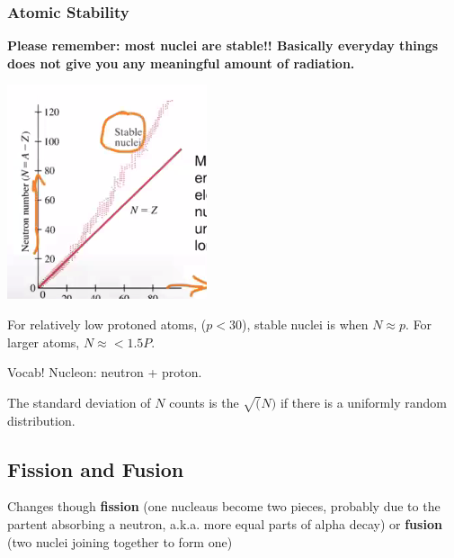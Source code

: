 \documentclass[letterpaper]{article}
\begin{document}
\subsubsection{Atomic Stability}
\label{sec:org265c84f}
\textbf{Please remember: most nuclei are stable!! Basically everyday things
does not give you any meaningful amount of radiation.}

\begin{center}
\includegraphics[width=.9\linewidth]{stablenuclei.png}
\end{center}

For relatively low protoned atoms, (\(p < 30\)), stable nuclei is when
\(N \approx p\). For larger atoms, \(N \approx < 1.5P\).

Vocab! Nucleon: neutron + proton.

The standard deviation of \(N\) counts is the \(\sqrt(N)\) if there is a
uniformly random distribution.

\subsection{Fission and Fusion}
\label{sec:orgdd927a6}
Changes though \textbf{fission} (one nucleaus become two pieces, probably due
to the partent absorbing a neutron, a.k.a. more equal parts of alpha
decay) or \textbf{fusion} (two nuclei joining together to form one)
\end{document}
